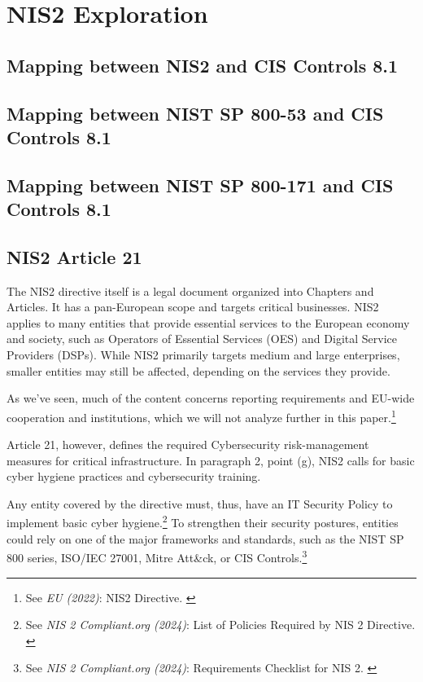 %
%

\pagebreak
\section{NIS2 Exploration}

\onehalfspacing

\subsection{Mapping between NIS2 and CIS Controls 8.1}

\subsection{Mapping between NIST SP 800-53 and CIS Controls 8.1}

\subsection{Mapping between NIST SP 800-171 and CIS Controls 8.1}

\subsection{NIS2 Article 21}

The NIS2 directive itself is a legal document organized into Chapters and Articles. It has a pan-European scope and targets critical businesses. NIS2 applies to many entities that provide essential services to the European economy and society, such as Operators of Essential Services (OES) and Digital Service Providers (DSPs). While NIS2 primarily targets medium and large enterprises, smaller entities may still be affected, depending on the services they provide.

As we've seen, much of the content concerns reporting requirements and EU-wide cooperation and institutions, which we will not analyze further in this paper.\footnote{See \textit{EU (2022)}: NIS2 Directive. \cite{nis2}}

Article 21, however, defines the required Cybersecurity risk-management measures for critical infrastructure. In paragraph 2, point (g), NIS2 calls for basic cyber hygiene practices and cybersecurity training.

Any entity covered by the directive must, thus, have an IT Security Policy to implement basic cyber hygiene.\footnote{See \textit{NIS 2 Compliant.org (2024)}: List of Policies Required by NIS 2 Directive. \cite{nisPols}} To strengthen their security postures, entities could rely on one of the major frameworks and standards, such as the NIST SP 800 series, ISO/IEC 27001, Mitre Att\&ck, or CIS Controls.\footnote{See \textit{NIS 2 Compliant.org (2024)}: Requirements Checklist for NIS 2. \cite{nisReqs}}

